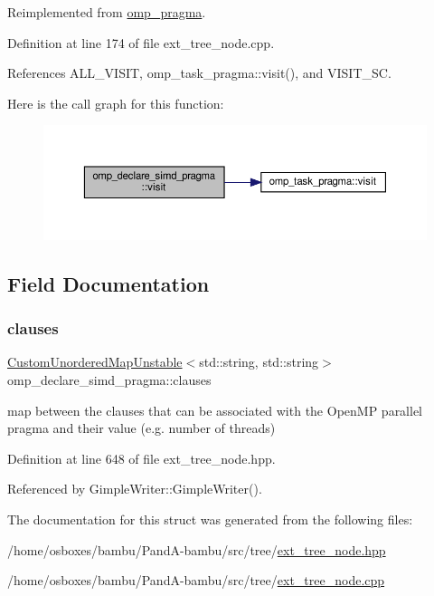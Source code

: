 Reimplemented from \hyperlink{structomp__pragma_a2e2c445528b7e097ae76fa618a9970b5}{omp\+\_\+pragma}.



Definition at line 174 of file ext\+\_\+tree\+\_\+node.\+cpp.



References A\+L\+L\+\_\+\+V\+I\+S\+IT, omp\+\_\+task\+\_\+pragma\+::visit(), and V\+I\+S\+I\+T\+\_\+\+SC.

Here is the call graph for this function\+:
\nopagebreak
\begin{figure}[H]
\begin{center}
\leavevmode
\includegraphics[width=350pt]{df/d3f/structomp__declare__simd__pragma_a3745037752b1b165a418e50058eed19a_cgraph}
\end{center}
\end{figure}


\subsection{Field Documentation}
\mbox{\label{structomp__declare__simd__pragma_a2f2bffc513678b2e6fc7a5f2f0da523e}} 
\subsubsection{\texorpdfstring{clauses}{clauses}}
{\footnotesize\ttfamily \hyperlink{custom__map_8hpp_a8cbaceffc09790a885ec7e9c17809c69}{Custom\+Unordered\+Map\+Unstable}$<$std\+::string, std\+::string$>$ omp\+\_\+declare\+\_\+simd\+\_\+pragma\+::clauses}



map between the clauses that can be associated with the Open\+MP parallel pragma and their value (e.\+g. number of threads) 



Definition at line 648 of file ext\+\_\+tree\+\_\+node.\+hpp.



Referenced by Gimple\+Writer\+::\+Gimple\+Writer().



The documentation for this struct was generated from the following files\+:\begin{DoxyCompactItemize}
\item 
/home/osboxes/bambu/\+Pand\+A-\/bambu/src/tree/\hyperlink{ext__tree__node_8hpp}{ext\+\_\+tree\+\_\+node.\+hpp}\item 
/home/osboxes/bambu/\+Pand\+A-\/bambu/src/tree/\hyperlink{ext__tree__node_8cpp}{ext\+\_\+tree\+\_\+node.\+cpp}\end{DoxyCompactItemize}
